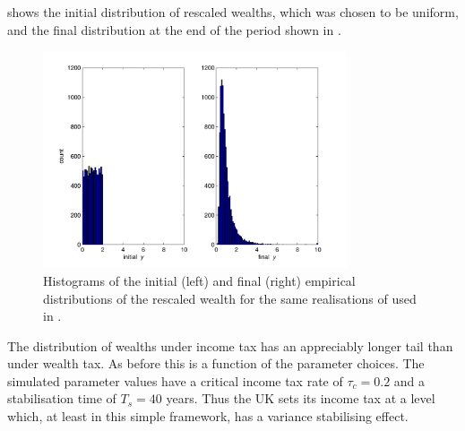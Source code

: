  shows the initial distribution of rescaled wealths, which was chosen to be uniform, and the final distribution at the end of the period shown in .
\begin{figure}
\bc
\includegraphics[width=0.8\textwidth]{./chapter_3/figs/hist_income.pdf}
\caption{Histograms of the initial (left) and final (right) empirical distributions of the rescaled wealth for the same realisations of  used in .}
\ec
\end{figure}
The distribution of wealths under income tax has an appreciably longer tail than under wealth tax. As before this is a function of the parameter choices. The simulated parameter values have a critical income tax rate of $\tau_c=0.2$ and a stabilisation time of $T_s=40$ years. Thus the UK sets its income tax at a level which, at least in this simple framework, has a variance stabilising effect.
\FloatBarrier
%
%
%
%
%